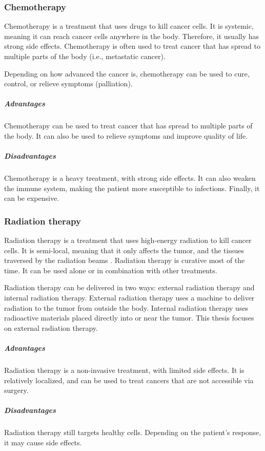 \subsubsection{Chemotherapy}
Chemotherapy is a treatment that uses drugs to kill cancer cells.
It is systemic, meaning it can reach cancer cells anywhere in the body.
Therefore, it usually has strong side effects.
Chemotherapy is often used to treat cancer that has spread to multiple parts of the body (i.e., metastatic cancer).

Depending on how advanced the cancer is, chemotherapy can be used to cure, control, or relieve symptoms (palliation).

\subparagraph{Advantages}
Chemotherapy can be used to treat cancer that has spread to multiple parts of the body.
It can also be used to relieve symptoms and improve quality of life.

\subparagraph{Disadvantages}
Chemotherapy is a heavy treatment, with strong side effects.
It can also weaken the immune system, making the patient more susceptible to infections.
Finally, it can be expensive.

\subsubsection{Radiation therapy}
Radiation therapy is a treatment that uses high-energy radiation to kill cancer cells.
It is semi-local, meaning that it only affects the tumor, and the tissues traversed by the radiation beams \cite{Thariat2013}.
Radiation therapy is curative most of the time.
It can be used alone or in combination with other treatments.

Radiation therapy can be delivered in two ways: external radiation therapy and internal radiation therapy.
External radiation therapy uses a machine to deliver radiation to the tumor from outside the body.
Internal radiation therapy uses radioactive materials placed directly into or near the tumor.
This thesis focuses on external radiation therapy.

\subparagraph{Advantages}
Radiation therapy is a non-invasive treatment, with limited side effects.
It is relatively localized, and can be used to treat cancers that are not accessible via surgery.

\subparagraph{Disadvantages}
Radiation therapy still targets healthy cells.
Depending on the patient's response, it may cause side effects.

